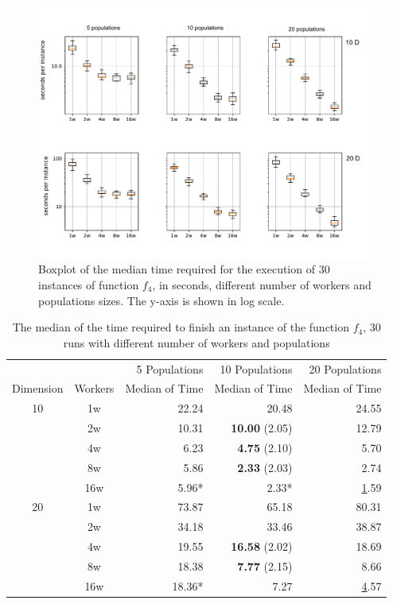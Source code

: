 \documentclass[review]{elsarticle}
\begin{document}
%
\begin{figure}[h!tbp]
  \centering
  \includegraphics[width=\textwidth]{secs_per_instance}
  \caption{Boxplot of the median time required for the execution of 30 
  instances of function $f_4$, in seconds, different number of workers and populations sizes. The y-axis is shown in log scale.  }
  \label{fig:spworker:time}
\end{figure}
%
\begin{table}[tbp]
  \caption{The median of the time required to finish an instance of the function $f_4$, 30 runs
  with different number of workers and populations}
  \label{tab:time}
  \vspace{0.25cm}
    \centering
    \begin{tabular}{ccrrr}
    \hline
              &         & 5 Populations    & 10 Populations & 20 Populations \\
     Dimension& Workers & Median of Time   & Median of Time & Median of Time  \\
    \hline
          10  & 1w      & 22.24  & 20.48           & 24.55  \\
              & 2w      & 10.31  & \textbf{10.00} (2.05)    & 12.79 \\
              & 4w      &  6.23  & \textbf{4.75} (2.10)     &  5.70 \\
              & 8w      &  5.86  &  \textbf{2.33} (2.03)           & 2.74 \\
              & 16w     &  5.96*  &  2.33*           & {\ul 1.59} \\
    
    \hline
          20  & 1w   & 73.87   & 65.18                 & 80.31 \\
              & 2w   & 34.18   & 33.46                 & 38.87 \\
              & 4w   & 19.55   & \textbf{16.58} (2.02) & 18.69 \\
              & 8w   & 18.38   & \textbf{7.77} (2.15)  & 8.66 \\
              & 16w  & 18.36*  & 7.27                  & {\ul 4.57} \\
    \hline
  \end{tabular}
\end{table}
\end{document}
